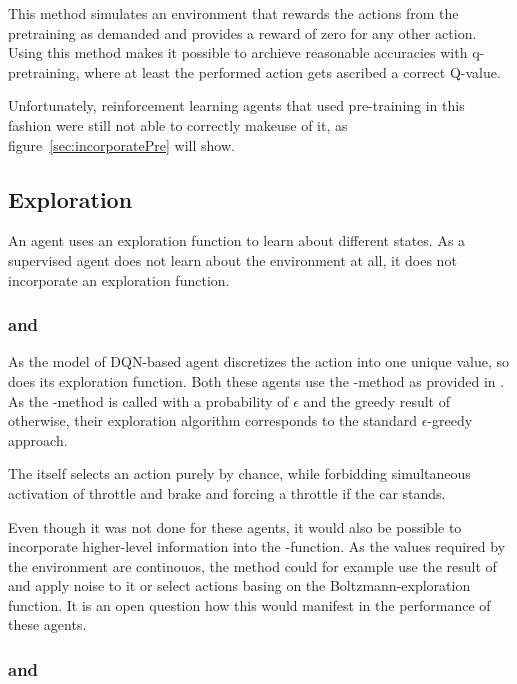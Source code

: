 This method simulates an environment that rewards the actions from the pretraining as demanded and provides a reward of zero for any other action. Using this method makes it possible to archieve reasonable accuracies with q-pretraining, where at least the performed action gets ascribed a correct Q-value. 

Unfortunately, reinforcement learning agents that used pre-training in this fashion were still not able to correctly makeuse of it, as figure~\ref{sec:incorporatePre} will show.

\subsection{Exploration}

An agent uses an exploration function to learn about different states. As a supervised agent does not learn about the environment at all, it does not incorporate an exploration function.

\subsubsection{ and }

As the model of DQN-based agent discretizes the action into one unique value, so does its exploration function. Both these agents use the -method as provided in . As the -method is called with a probability of $\epsilon$ and the greedy result of  otherwise, their exploration algorithm corresponds to the standard $\epsilon$-greedy approach.

The  itself selects an action purely by chance, while forbidding simultaneous activation of throttle and brake and forcing a throttle if the car stands.

Even though it was not done for these agents, it would also be possible to incorporate higher-level information into the -function. As the values required by the environment are continouos, the method could for example use the result of  and apply noise to it or select actions basing on the Boltzmann-exploration function. It is an open question how this would manifest in the performance of these agents.

\subsubsection{ and }


